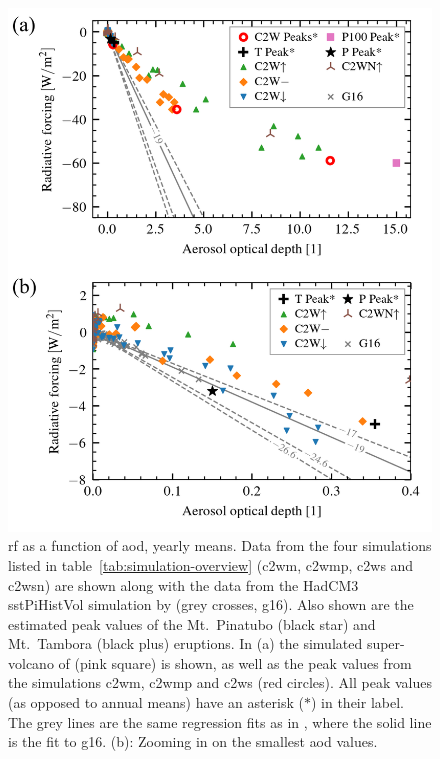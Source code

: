 \documentclass{ametsocV6.1}
\begin{document}
\begin{figure}
  \centering
  \includegraphics{figures/figure2.png}

  \caption{\gls{rf} as a function of \gls{aod}, yearly means. Data from the four
    simulations listed in table~\ref{tab:simulation-overview} (\gls{c2wm}, \gls{c2wmp},
    \gls{c2ws} and \gls{c2wsn}) are shown along with the data from the HadCM3 sstPiHistVol
    simulation by \citet{gregory2016} (grey crosses, \gls{g16}). Also shown are the
    estimated peak values of the Mt.\ Pinatubo (black star) and Mt.\ Tambora (black plus)
    eruptions. In (a) the simulated super-volcano of \citet{jones2005} (pink square) is
    shown, as well as the peak values from the simulations \gls{c2wm}, \gls{c2wmp} and
    \gls{c2ws} (red circles). All peak values (as opposed to annual means) have an asterisk
    (\(\ast{}\)) in their label. The grey lines are the same regression fits as in
    \citet[][Fig.\ 4]{gregory2016}, where the solid line is the fit to \gls{g16}. (b):
    Zooming in on the smallest \gls{aod} values.}\label{fig:aod_vs_toa_ses_avg}%
\end{figure}
\end{document}
